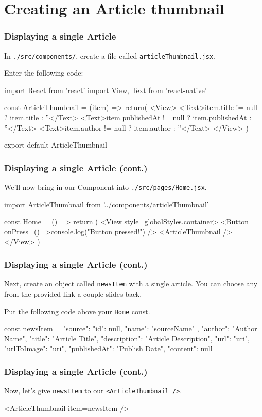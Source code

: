 \documentclass{beamer}
\begin{document}
  \section{Creating an Article thumbnail}
  \begin{frame}[fragile]
    \frametitle{Displaying a single Article}
    In \verb|./src/components/|, create a file called \verb|articleThumbnail.jsx|.

    Enter the following code: 

    \begin{jscodesmall}
import React from 'react'
import {View, Text} from 'react-native'

const ArticleThumbnail = ({item}) => {
  return(
    <View>
      <Text>{item.title != null ? item.title : ''}</Text>
      <Text>{item.publishedAt != null ? item.publishedAt : ''}</Text>
      <Text>{item.author != null ? item.author : ''}</Text>
    </View>
  )
}

export default ArticleThumbnail
    \end{jscodesmall}
  \end{frame}
  \begin{frame}[fragile]
    \frametitle{Displaying a single Article (cont.)}
    We'll now bring in our Component into \verb|./src/pages/Home.jsx|. 

    \begin{jscodesmall}
import ArticleThumbnail from '../components/articleThumbnail'

const Home = () => {
  return (
    <View style={globalStyles.container}>
      <Button onPress={()=>{console.log("Button pressed!")}} />
      <ArticleThumbnail />
    </View>
  )
}
    \end{jscodesmall}
  \end{frame}
  \begin{frame}[fragile]
    \frametitle{Displaying a single Article (cont.)}
    Next, create an object called \verb|newsItem| with a single article. 
    You can choose any from the provided link a couple slides back.

    Put the following code above your \verb|Home| const.

    \begin{jscodesmall}
const newsItem = {
  "source": {
      "id": null,
      "name": "sourceName"
  },
  "author": "Author Name",
  "title": "Article Title",
  "description": "Article Description",
  "url": "uri",
  "urlToImage": "uri",
  "publishedAt": "Publish Date",
  "content": null
}
    \end{jscodesmall}
  \end{frame}
  \begin{frame}[fragile]
    \frametitle{Displaying a single Article (cont.)}
    Now, let's give \verb|newsItem| to our \verb|<ArticleThumbnail />|.

    \begin{jscode}
<ArticleThumbnail item={newsItem} />
    \end{jscode}
  \end{frame}
\end{document}
